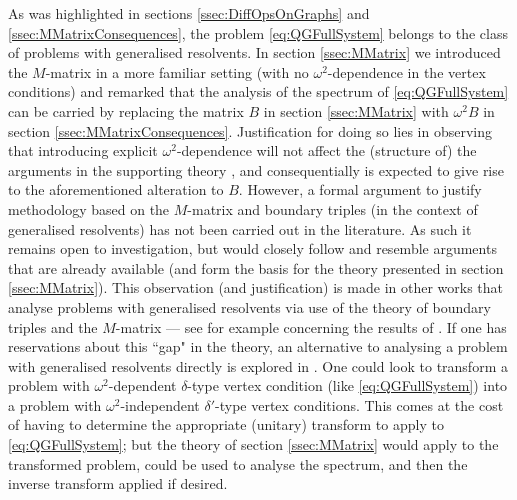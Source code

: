 As was highlighted in sections \ref{ssec:DiffOpsOnGraphs} and \ref{ssec:MMatrixConsequences}, the problem \eqref{eq:QGFullSystem} belongs to the class of problems with generalised resolvents.
In section \ref{ssec:MMatrix} we introduced the $M$-matrix in a more familiar setting (with no $\omega^2$-dependence in the vertex conditions) and remarked that the analysis of the spectrum of \eqref{eq:QGFullSystem} can be carried by replacing the matrix $B$ in section \ref{ssec:MMatrix} with $\omega^2 B$ in section \ref{ssec:MMatrixConsequences}.
Justification for doing so lies in observing that introducing explicit $\omega^2$-dependence will not affect the (structure of) the arguments in the supporting theory , and consequentially is expected to give rise to the aforementioned alteration to $B$.
However, a formal argument to justify methodology based on the $M$-matrix and boundary triples (in the context of generalised resolvents) has not been carried out in the literature.
As such it remains open to investigation, but would closely follow and resemble arguments that are already available (and form the basis for the theory presented in section \ref{ssec:MMatrix}).
This observation (and justification) is made in other works that analyse problems with generalised resolvents via use of the theory of boundary triples and the $M$-matrix --- see for example \cite[page 1846]{cherednichenko2018effective} concerning the results of .
If one has reservations about this ``gap" in the theory, an alternative to analysing a problem with generalised resolvents directly is explored in \cite[Section 6]{cherednichenko2017norm}.
One could look to transform a problem with $\omega^2$-dependent $\delta$-type vertex condition (like \eqref{eq:QGFullSystem}) into a problem with $\omega^2$-independent $\delta'$-type vertex conditions.
This comes at the cost of having to determine the appropriate (unitary) transform to apply to \eqref{eq:QGFullSystem}; but the theory of section \ref{ssec:MMatrix} would apply to the transformed problem, could be used to analyse the spectrum, and then the inverse transform applied if desired.

